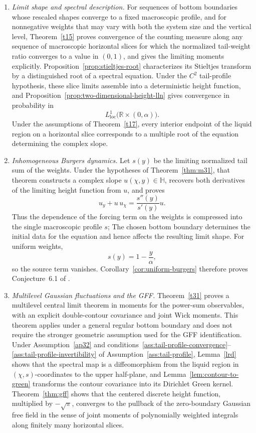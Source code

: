 \documentclass[11pt]{amsart}
\newenvironment{introrevision}{\begingroup\color{black}}{\endgroup}
\theoremstyle{plain}
\numberwithin{equation}{section}
\numberwithin{theorem}{section}
\numberwithin{figure}{section}
\begin{document}
\begin{introrevision}
\begin{enumerate}[label=\textup{(\roman*)},leftmargin=*]
\item
\emph{Limit shape and spectral description.}
For sequences of bottom boundaries whose rescaled shapes converge to
a fixed macroscopic profile, and for nonnegative weights that may vary
with both the system size and the vertical level,
Theorem~\ref{t15} proves  convergence of the counting
measure along any sequence of macroscopic horizontal slices for which
the normalized tail-weight ratio converges to a value in $(0,1)$, and
gives the limiting moments explicitly. Proposition~\ref{prop:stieltjes-root}
characterizes its Stieltjes transform by a distinguished root of a
spectral equation. Under the $C^2$ tail-profile hypothesis, these
slice limits assemble into a deterministic height function, and
Proposition~\ref{prop:two-dimensional-height-lln} gives convergence in
probability in
\[
    L^1_{\mathrm{loc}}\bigl(\mathbb R\times(0,\alpha)\bigr).
\]
Under the assumptions of Theorem~\ref{t17}, every interior endpoint of
the liquid region on a horizontal slice corresponds to a multiple root
of the equation determining the complex slope.

\item
\emph{Inhomogeneous Burgers dynamics.}
Let $s(y)$ be the limiting normalized tail sum of the weights.
Under the hypotheses of Theorem~\ref{thm:m31}, that
theorem constructs a complex slope
$u(\chi,y)\in\mathbb H$, recovers both derivatives of the limiting
height function from $u$, and proves
\[
    u_y+u\,u_\chi
    =
    \frac{s''(y)}{s'(y)}u.
\]
Thus the dependence of the forcing term on the weights is compressed
into the single macroscopic profile $s$; The chosen bottom boundary determines the initial data for the equation
and hence affects the resulting limit shape.  For
uniform weights,
\[
    s(y)=1-\frac{y}{\alpha},
\]
so the source term vanishes. Corollary~\ref{cor:uniform-burgers}
therefore proves Conjecture~6.1 of \cite{SKN21}.

\item
\emph{Multilevel Gaussian fluctuations and the GFF.}
Theorem~\ref{t31} proves a multilevel central limit theorem in moments
for the power-sum observables, with an explicit double-contour
covariance and joint Wick moments. This theorem applies under a
general regular bottom boundary and does not require the stronger
geometric assumption used for the GFF identification. Under
Assumption~\ref{ap32} and
conditions~\ref{ass:tail-profile-convergence}--\ref{ass:tail-profile-invertibility}
of Assumption~\ref{ass:tail-profile}, Lemma~\ref{lrd} shows that the
spectral map is a diffeomorphism from the liquid region in
$(\chi,s)$-coordinates to the upper half-plane, and
Lemma~\ref{lem:contour-to-green} transforms
the contour covariance into its Dirichlet Green kernel. Theorem~\ref{thm:gff} shows that the centered discrete height function,
multiplied by $-\sqrt{\pi}$, converges to the pullback of the
zero-boundary Gaussian free field in the sense of joint moments of
polynomially weighted integrals along finitely many horizontal slices.


\end{enumerate}
\end{introrevision}
\end{document}
